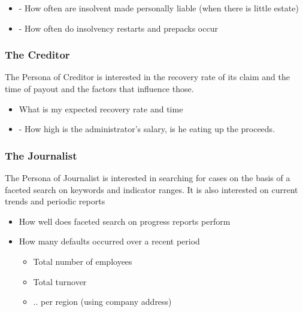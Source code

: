 \begin{itemize}
	\item -	How often are insolvent made personally liable (when there is little estate)
	\item -	How often do insolvency restarts and prepacks occur
\end{itemize}

\subsubsection{The Creditor}
The Persona of Creditor is interested in the recovery rate of its claim and the time of payout and the factors that influence those.

\begin{itemize}
	\item What is my expected recovery rate and time
	\item -	How high is the administrator’s salary, is he eating up the proceeds.
\end{itemize}

\subsubsection{The Journalist}
The Persona of Journalist is interested in searching for cases on the basis of a faceted search on keywords and indicator ranges. It is also interested on current trends and periodic reports

\begin{itemize}
	\item How well does faceted search on progress reports perform
	\item How many defaults occurred over a recent period
	\begin{itemize}
		\item Total number of employees
		\item Total turnover
		\item .. per region (using company address)
	\end{itemize}

\end{itemize}
